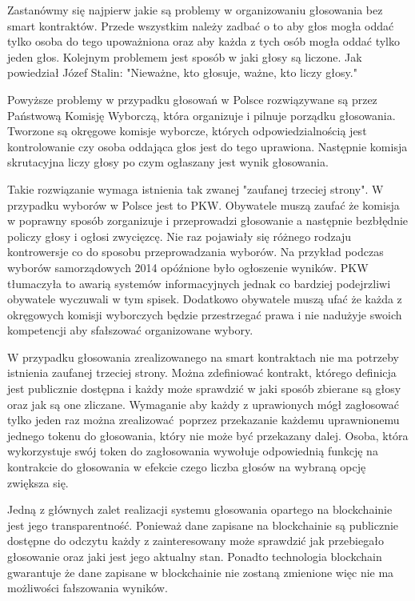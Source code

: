 \documentclass[]{llncs}
\begin{document}
  Zastanówmy się najpierw jakie są problemy w organizowaniu głosowania bez smart
  kontraktów. Przede wszystkim należy zadbać o to aby głos mogła oddać tylko
  osoba do tego upoważniona oraz aby każda z tych osób mogła oddać tylko jeden
  głos. Kolejnym problemem jest sposób w jaki głosy są liczone. Jak powiedział
  Józef Stalin: "Nieważne, kto głosuje, ważne, kto liczy głosy."

  Powyższe problemy w przypadku głosowań w Polsce rozwiązywane są przez
  Państwową Komisję Wyborczą, która organizuje i pilnuje porządku głosowania.
  Tworzone są okręgowe komisje wyborcze, których odpowiedzialnością jest
  kontrolowanie czy osoba oddająca głos jest do tego uprawiona. Następnie
  komisja skrutacyjna liczy głosy po czym ogłaszany jest wynik głosowania.

  Takie rozwiązanie wymaga istnienia tak zwanej "zaufanej trzeciej strony". W
  przypadku wyborów w Polsce jest to PKW. Obywatele muszą zaufać że komisja w
  poprawny sposób zorganizuje i przeprowadzi głosowanie a następnie bezbłędnie
  policzy głosy i ogłosi zwycięzcę.  Nie raz pojawiały się różnego rodzaju
  kontrowersje co do sposobu przeprowadzania wyborów. Na przykład podczas
  wyborów samorządowych 2014 opóźnione było ogłoszenie wyników.  PKW tłumaczyła
  to awarią systemów informacyjnych jednak co bardziej podejrzliwi obywatele
  wyczuwali w tym spisek. Dodatkowo obywatele muszą ufać że każda z okręgowych
  komisji wyborczych będzie przestrzegać prawa i nie nadużyje swoich kompetencji
  aby sfałszować organizowane wybory.

  W przypadku głosowania zrealizowanego na smart kontraktach nie ma potrzeby
  istnienia zaufanej trzeciej strony. Można zdefiniować kontrakt, którego
  definicja jest publicznie dostępna i każdy może sprawdzić w jaki sposób
  zbierane są głosy oraz jak są one zliczane. Wymaganie aby każdy z uprawionych
  mógł zagłosować tylko jeden raz można zrealizować poprzez przekazanie każdemu
  uprawnionemu jednego tokenu do głosowania, który nie może być przekazany
  dalej.  Osoba, która wykorzystuje swój token do zagłosowania wywołuje
  odpowiednią funkcję na kontrakcie do głosowania w efekcie czego liczba głosów
  na wybraną opcję zwiększa się.

  Jedną z głównych zalet realizacji systemu głosowania opartego na blockchainie
  jest jego transparentność. Ponieważ dane zapisane na blockchainie są
  publicznie dostępne do odczytu każdy z zainteresowany może sprawdzić jak
  przebiegało głosowanie oraz jaki jest jego aktualny stan. Ponadto technologia
  blockchain gwarantuje że dane zapisane w blockchainie nie zostaną zmienione
  więc nie ma możliwości fałszowania wyników.
\end{document}
